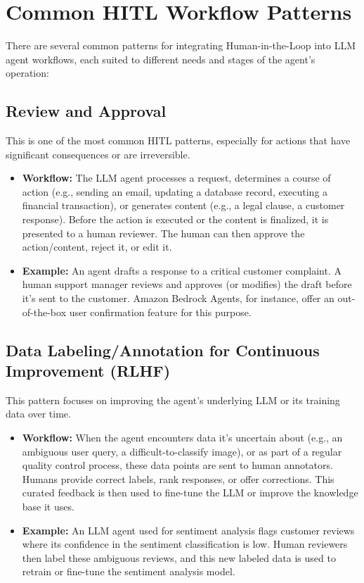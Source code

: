 \section{Common HITL Workflow Patterns}
There are several common patterns for integrating Human-in-the-Loop into LLM agent workflows, each suited to different needs and stages of the agent's operation:

\subsection*{Review and Approval}
This is one of the most common HITL patterns, especially for actions that have significant consequences or are irreversible.
\begin{itemize}
    \item \textbf{Workflow:} The LLM agent processes a request, determines a course of action (e.g., sending an email, updating a 
    database record, executing a financial transaction), or generates content (e.g., a legal clause, a customer response). 
    Before the action is executed or the content is finalized, it is presented to a human reviewer. 
    The human can then approve the action/content, reject it, or edit it.
    \item \textbf{Example:} An agent drafts a response to a critical customer complaint. A human support manager reviews and 
    approves (or modifies) the draft before it's sent to the customer. Amazon Bedrock Agents, for instance, offer an 
    out-of-the-box user confirmation feature for this purpose.
\end{itemize}

\subsection*{Data Labeling/Annotation for Continuous Improvement (RLHF)}
This pattern focuses on improving the agent's underlying LLM or its training data over time.
\begin{itemize}
    \item \textbf{Workflow:} When the agent encounters data it's uncertain about (e.g., an ambiguous user query, a difficult-to-classify image),
     or as part of a regular quality control process, these data points are sent to human annotators. Humans provide correct labels,
      rank responses, or offer corrections. This curated feedback is then used to fine-tune the LLM or improve the knowledge base it uses.
    \item \textbf{Example:} An LLM agent used for sentiment analysis flags customer reviews where its confidence in the sentiment
     classification is low. Human reviewers then label these ambiguous reviews, and this new labeled data is used to retrain or
      fine-tune the sentiment analysis model.
\end{itemize}

